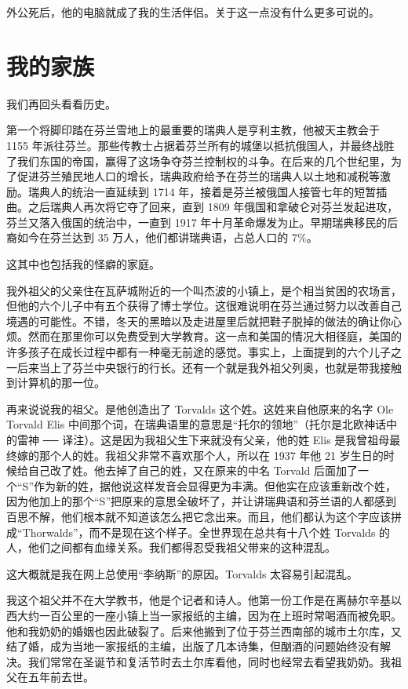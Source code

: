 外公死后，他的电脑就成了我的生活伴侣。关于这一点没有什么更多可说的。

 
\section{我的家族}

我们再回头看看历史。

第一个将脚印踏在芬兰雪地上的最重要的瑞典人是亨利主教，他被天主教会于 1155 年派往芬兰。那些传教士占据着芬兰所有的城堡以抵抗俄国人，并最终战胜了我们东国的帝国，赢得了这场争夺芬兰控制权的斗争。在后来的几个世纪里，为了促进芬兰殖民地人口的增长，瑞典政府给予在芬兰的瑞典人以土地和减税等激励。瑞典人的统治一直延续到 1714 年，接着是芬兰被俄国人接管七年的短暂插曲。之后瑞典人再次将它夺了回来，直到 1809 年俄国和拿破仑对芬兰发起进攻，芬兰又落入俄国的统治中，一直到 1917 年十月革命爆发为止。早期瑞典移民的后裔如今在芬兰达到 35 万人，他们都讲瑞典语，占总人口的 7\%。

这其中也包括我的怪癖的家庭。

我外祖父的父亲住在瓦萨城附近的一个叫杰波的小镇上，是个相当贫困的农场言，但他的六个儿子中有五个获得了博士学位。这很难说明在芬兰通过努力以改善自己境遇的可能性。不错，冬天的黑暗以及走进屋里后就把鞋子脱掉的做法的确让你心烦。然而在那里你可以免费受到大学教育。这一点和美国的情况大相径庭，美国的许多孩子在成长过程中都有一种毫无前途的感觉。事实上，上面提到的六个儿子之一后来当上了芬兰中央银行的行长。还有一个就是我外祖父列奥，也就是带我接触到计算机的那一位。

再来说说我的祖父。是他创造出了 Torvalds 这个姓。这姓来自他原来的名字 Ole Torvald Elis 中间那个词，在瑞典语里的意思是“托尔的领地”（托尔是北欧神话中的雷神 ── 译注）。这是因为我祖父生下来就没有父亲，他的姓 Elis 是我曾祖母最终嫁的那个人的姓。我祖父非常不喜欢那个人，所以在 1937 年他 21 岁生日的时候给自己改了姓。他去掉了自己的姓，又在原来的中名 Torvald 后面加了一个“S”作为新的姓，据他说这样发音会显得更为丰满。但他实在应该重新改个姓，因为他加上的那个“S”把原来的意思全破坏了，并让讲瑞典语和芬兰语的人都感到百思不解，他们根本就不知道该怎么把它念出来。而且，他们都认为这个字应该拼成“Thorwalds”，而不是现在这个样子。全世界现在总共有十八个姓 Torvalds 的人，他们之间都有血缘关系。我们都得忍受我祖父带来的这种混乱。

这大概就是我在网上总使用“李纳斯”的原因。Torvalds 太容易引起混乱。

我这个祖父并不在大学教书，他是个记者和诗人。他第一份工作是在离赫尔辛基以西大约一百公里的一座小镇上当一家报纸的主编，因为在上班时常喝酒而被免职。他和我奶奶的婚姻也因此破裂了。后来他搬到了位于芬兰西南部的城市土尔库，又结了婚，成为当地一家报纸的主编，出版了几本诗集，但酗酒的问题始终没有解决。我们常常在圣诞节和复活节时去土尔库看他，同时也经常去看望我奶奶。我祖父在五年前去世。

